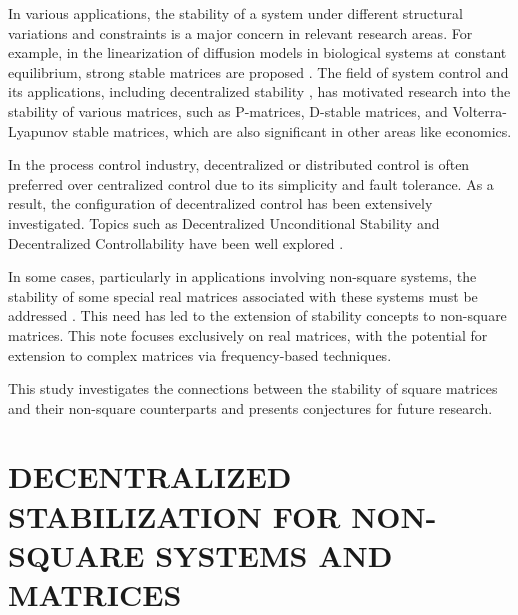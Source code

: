 \documentclass{article}
\begin{document}

In various applications, the stability of a system under different structural variations and constraints is a major concern in relevant research areas. For example, in the linearization of diffusion models in biological systems at constant equilibrium, strong stable matrices are proposed \cite{CROSS1978253, hadeler2006nonlinear}. The field of system control and its applications, including decentralized stability \cite{sun2023gallery, Wang:-On, hadeler2006nonlinear, johnson1974sufficient, goh1977global, iggidr2023limits, barker1978positive}, has motivated research into the stability of various matrices, such as P-matrices, D-stable matrices, and Volterra-Lyapunov stable matrices, which are also significant in other areas like economics.

In the process control industry, decentralized or distributed control is often preferred over centralized control due to its simplicity and fault tolerance. As a result, the configuration of decentralized control has been extensively investigated. Topics such as Decentralized Unconditional Stability and Decentralized Controllability have been well explored \cite{anderson1981algebraic, Anderson:-Alge, Sko:-ariab, grosdidier1986interaction, Su:-Analy}.

In some cases, particularly in applications involving non-square systems, the stability of some special real matrices associated with these systems must be addressed \cite{zhang2017multiloop, WHEATON20171, zhiteckii2022robust, sujatha2022control, steentjes2022data}. This need has led to the extension of stability concepts to non-square matrices. This note focuses exclusively on real matrices, with the potential for extension to complex matrices via frequency-based techniques.

This study investigates the connections between the stability of square matrices and their non-square counterparts and presents conjectures for future research.

\section{DECENTRALIZED STABILIZATION FOR NON-SQUARE SYSTEMS AND MATRICES}
\end{document}
